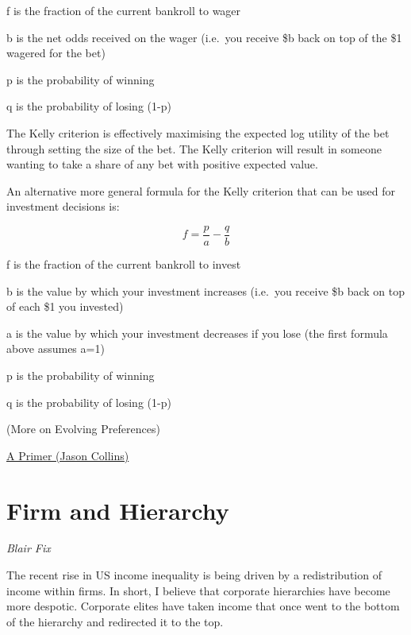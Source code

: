 \documentclass[
]{book}
\begin{document}
f is the fraction of the current bankroll to wager

b is the net odds received on the wager (i.e.~you receive \$b back on top of the \$1 wagered for the bet)

p is the probability of winning

q is the probability of losing (1-p)

The Kelly criterion is effectively maximising the expected log utility of the bet
through setting the size of the bet.
The Kelly criterion will result in someone wanting to take
a share of any bet with positive expected value.

An alternative more general formula for the Kelly criterion that can be used for investment decisions is:

\[f = \frac{p}{a} - \frac{q}{b}\]

f is the fraction of the current bankroll to invest

b is the value by which your investment increases (i.e.~you receive \$b back on top of each \$1 you invested)

a is the value by which your investment decreases if you lose (the first formula above assumes a=1)

p is the probability of winning

q is the probability of losing (1-p)

(More on Evolving Preferences)

\href{https://jasoncollins.blog/2020/01/22/ergodicity-economics-a-primer/}{A Primer (Jason Collins)}

\hypertarget{firm-and-hierarchy}{%
\chapter{Firm and Hierarchy}\label{firm-and-hierarchy}}

\emph{Blair Fix}

The recent rise in US income inequality is being driven by a redistribution of income within firms. In short, I believe that corporate hierarchies have become more despotic. Corporate elites have taken income that once went to the bottom of the hierarchy and redirected it to the top.
\end{document}
